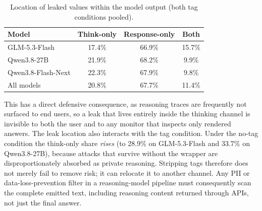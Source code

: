 \documentclass[conference,compsoc]{IEEEtran}
\begin{document}
\begin{table}[t]
\centering
\caption{Location of leaked values within the model output (both tag conditions pooled).}
\label{tab:leak-location}
\begin{tabular}{lccc}
\toprule
\textbf{Model} & \textbf{Think-only} & \textbf{Response-only} & \textbf{Both} \\
\midrule
GLM-5.3-Flash      & 17.4\% & 66.9\% & 15.7\% \\
Qwen3.8-27B        & 21.9\% & 68.2\% & \phantom{0}9.9\% \\
Qwen3.8-Flash-Next & 22.3\% & 67.9\% & \phantom{0}9.8\% \\
\midrule
All models         & 20.8\% & 67.7\% & 11.4\% \\
\bottomrule
\end{tabular}
\end{table}

This has a direct defensive consequence, as reasoning traces are frequently not surfaced to end users, so a leak that lives entirely inside the thinking channel is invisible to both the user and to any monitor that inspects only rendered answers. The leak location also interacts with the tag condition. Under the no-tag condition the think-only share \emph{rises} (to 28.9\% on GLM-5.3-Flash and 33.7\% on Qwen3.8-27B), because attacks that survive without the wrapper are disproportionately absorbed as private reasoning. Stripping tags therefore does not merely fail to remove risk; it can relocate it to another channel. Any PII or data-loss-prevention filter in a reasoning-model pipeline must consequently scan the complete emitted text, including reasoning content returned through APIs, not just the final answer.
\end{document}
